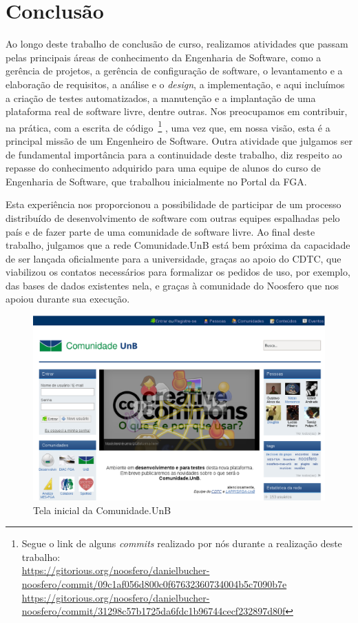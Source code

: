 \chapter{Conclusão}
\label{cap:conclusao}

Ao longo deste trabalho de conclusão de curso, realizamos atividades que passam
pelas principais áreas de conhecimento da Engenharia de Software, como a
gerência de projetos, a gerência de configuração de software,
o levantamento e a elaboração de requisitos, a análise e o \textit{design},
a implementação, e aqui incluímos a criação de testes automatizados,
a manutenção e a implantação de uma plataforma real de software livre, dentre
outras.
%
Nos preocupamos em contribuir, na prática, com a escrita de código~\footnote{%
Segue o link de alguns \textit{commits} realizado por nós durante a realização
deste trabalho: \\
\url{https://gitorious.org/noosfero/danielbucher-noosfero/commit/09c1af056d800c0f67632360734004b5c7090b7e}\\
\url{https://gitorious.org/noosfero/danielbucher-noosfero/commit/31298c57b1725da6fdc1b96744cecf232897d80f}}
, uma vez que, em nossa visão, esta é a principal missão de um Engenheiro de
Software.
%
Outra atividade que julgamos ser de fundamental importância para a continuidade
deste trabalho, diz respeito ao repasse do conhecimento adquirido para uma
equipe de alunos do curso de Engenharia de Software, que trabalhou inicialmente
no Portal da FGA.

Esta experiência nos proporcionou a possibilidade de participar de um processo
distribuído de desenvolvimento de software com outras equipes espalhadas pelo
país e de fazer parte de uma comunidade de software livre.
%
Ao final deste trabalho, julgamos que a rede Comunidade.UnB está bem próxima
da capacidade de ser lançada oficialmente para a universidade, graças ao
apoio do CDTC, que viabilizou os contatos necessários para formalizar os
pedidos de uso, por exemplo, das bases de dados existentes nela, e graças
à comunidade do Noosfero que nos apoiou durante sua execução.

\begin{figure}[h!]
	\centering
	\includegraphics[keepaspectratio=true,scale=0.45]
	  {figuras/comunidade-unb.eps}
	\caption{Tela inicial da Comunidade.UnB}
	\label{homepage:comunidade.unb}
\end{figure}


